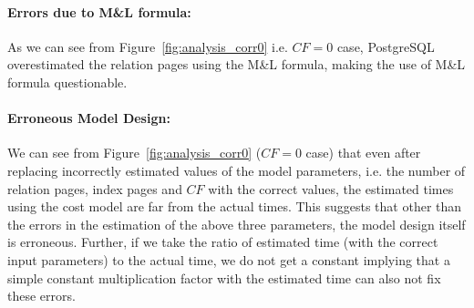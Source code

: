 \documentclass{article}
\begin{document}
\begin{multicols}{2}
	\paragraph{Errors due to M\&L formula:} As we can see from Figure~\ref{fig:analysis_corr0} i.e. $CF = 0$ case, PostgreSQL overestimated the relation pages using the M\&L formula, making the use of M\&L formula questionable.\\
	
	\paragraph{Erroneous Model Design:} 
	We can see from Figure~\ref{fig:analysis_corr0} ($CF = 0$ case) that even after replacing incorrectly estimated values of the model parameters, i.e. the number of relation pages, index pages and $CF$ with the correct values, the estimated times using the cost model are far from the actual times. This suggests that other than the errors in the estimation of the above three parameters, the model design itself is erroneous. Further, if we take the ratio of estimated time (with the correct input parameters) to the actual time, we do not get a constant implying that a simple constant multiplication factor with the estimated time can also not fix these errors.%
		

\end{multicols}
\end{document}
